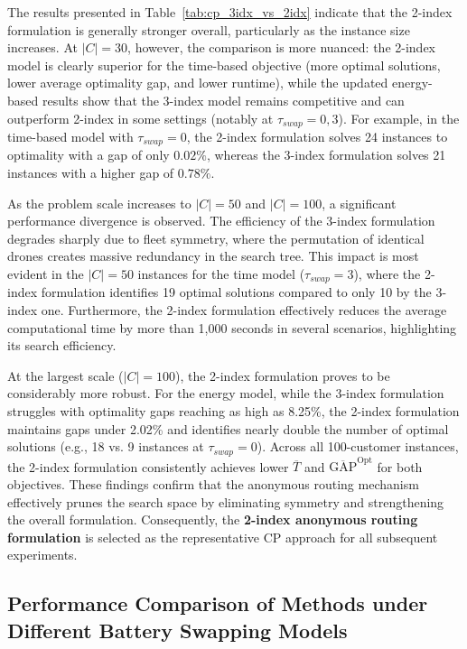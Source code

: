 \documentclass[3p, authoryear, 11pt]{elsarticle}
\begin{document}
The results presented in Table~\ref{tab:cp_3idx_vs_2idx} indicate that the 2-index formulation is generally stronger overall, particularly as the instance size increases. 
At \( |C|=30 \), however, the comparison is more nuanced: the 2-index model is clearly superior for the time-based objective (more optimal solutions, lower average optimality gap, and lower runtime), while the updated energy-based results show that the 3-index model remains competitive and can outperform 2-index in some settings (notably at \(\tau_{swap}=0,3\)). 
For example, in the time-based model with \(\tau_{swap}=0\), the 2-index formulation solves 24 instances to optimality with a gap of only \(0.02\%\), whereas the 3-index formulation solves 21 instances with a higher gap of \(0.78\%\).


As the problem scale increases to $|C|=50$ and $|C|=100$, a significant performance divergence is observed. The efficiency of the 3-index formulation degrades sharply due to fleet symmetry, where the permutation of identical drones creates massive redundancy in the search tree. This impact is most evident in the $|C|=50$ instances for the time model ($\tau_{swap}=3$), where the 2-index formulation identifies 19 optimal solutions compared to only 10 by the 3-index one. Furthermore, the 2-index formulation effectively reduces the average computational time by more than 1,000 seconds in several scenarios, highlighting its search efficiency.

At the largest scale ($|C|=100$), the 2-index formulation proves to be considerably more robust. For the energy model, while the 3-index formulation struggles with optimality gaps reaching as high as 8.25\%, the 2-index formulation maintains gaps under 2.02\% and identifies nearly double the number of optimal solutions (e.g., 18 vs. 9 instances at $\tau_{swap}=0$). Across all 100-customer instances, the 2-index formulation consistently achieves lower $\overline{T}$ and $\overline{\mathrm{GAP}}^{\mathrm{Opt}}$ for both objectives. These findings confirm that the anonymous routing mechanism effectively prunes the search space by eliminating symmetry and strengthening the overall formulation. Consequently, the \textbf{2-index anonymous routing formulation} is selected as the representative CP approach for all subsequent experiments.

\subsection{Performance Comparison of Methods under Different Battery Swapping Models}
\label{sec:performance_all}
\end{document}
